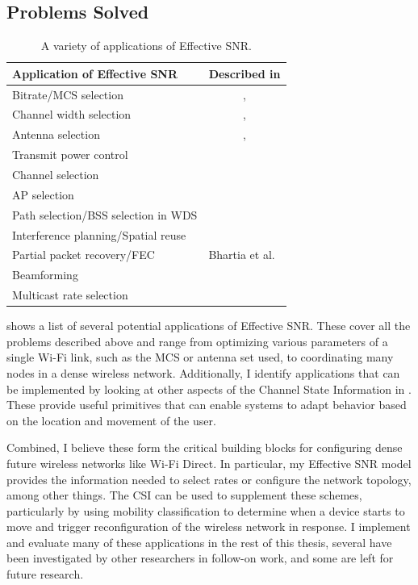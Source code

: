 \subsection{Problems Solved}
\begin{table}[htp]
	\centering
	\begin{tabular}{lc}
	\toprule
		\textbf{Application of Effective SNR} & \textbf{Described in} \\
	\midrule
		Bitrate/MCS selection & \chapref{chap:delivery}, \chapref{chap:rate}\\
		Channel width selection & \chapref{chap:delivery}, \chapref{chap:rate}\\
		Antenna selection & \chapref{chap:delivery}, \chapref{chap:rate}\\
		Transmit power control & \chapref{chap:delivery}\\
		Channel selection & \chapref{chap:applications}\\
		AP selection & \chapref{chap:applications}\\
		Path selection/BSS selection in WDS & \chapref{chap:applications}\\
		Interference planning/Spatial reuse \\
		Partial packet recovery/FEC & Bhartia et al.~\cite{Bhartia_FreqDiv}\\
		Beamforming \\
		Multicast rate selection \\
	\bottomrule
	\end{tabular}
	\caption[A variety of applications of Effective SNR]{\label{tab:esnr_uses}A variety of applications of Effective SNR\@.}
\end{table}

 shows a list of several potential applications of Effective SNR. These cover all the problems described above and range from optimizing various parameters of a single Wi-Fi link, such as the MCS or antenna set used, to coordinating many nodes in a dense wireless network. Additionally, I identify applications that can be implemented by looking at other aspects of the Channel State Information in . These provide useful primitives that can enable systems to adapt behavior based on the location and movement of the user.

Combined, I believe these form the critical building blocks for configuring dense future wireless networks like Wi-Fi Direct. In particular, my Effective SNR model provides the information needed to select rates or configure the network topology, among other things. The CSI can be used to supplement these schemes, particularly by using mobility classification to determine when a device starts to move and trigger reconfiguration of the wireless network in response. I implement and evaluate many of these applications in the rest of this thesis, several have been investigated by other researchers in follow-on work, and some are left for future research.

